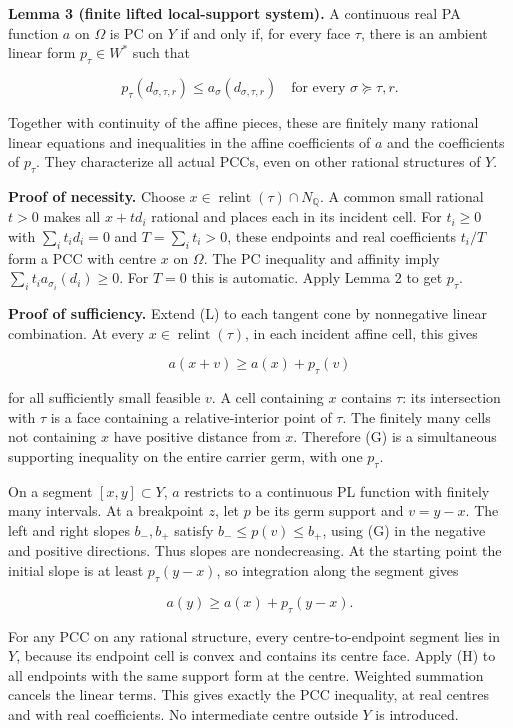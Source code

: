 \documentclass[
  10pt,
]{article}
\begin{document}
\textbf{Lemma 3 (finite lifted local-support system).} A continuous real
PA function \(a\) on \(\Omega\) is PC on \(Y\) if and only if, for every
face \(\tau\), there is an ambient linear form \(p_\tau\in W^*\) such
that

\[
p_\tau(d_{\sigma,\tau,r})
\leq a_\sigma(d_{\sigma,\tau,r})
\quad\text{for every }\sigma\succeq\tau,r. \tag{L}
\]

Together with continuity of the affine pieces, these are finitely many
rational linear equations and inequalities in the affine coefficients of
\(a\) and the coefficients of \(p_\tau\). They characterize all actual
PCCs, even on other rational structures of \(Y\).

\textbf{Proof of necessity.} Choose
\(x\in\operatorname{relint}(\tau)\cap N_{\mathbb Q}\). A common small
rational \(t>0\) makes all \(x+td_i\) rational and places each in its
incident cell. For \(t_i\geq0\) with \(\sum_i t_i d_i=0\) and
\(T=\sum_i t_i>0\), these endpoints and real coefficients \(t_i/T\) form
a PCC with centre \(x\) on \(\Omega\). The PC inequality and affinity
imply \(\sum_i t_i a_{\sigma_i}(d_i)\geq0\). For \(T=0\) this is
automatic. Apply Lemma 2 to get \(p_\tau\).

\textbf{Proof of sufficiency.} Extend (L) to each tangent cone by
nonnegative linear combination. At every
\(x\in\operatorname{relint}(\tau)\), in each incident affine cell, this
gives

\[
a(x+v)\geq a(x)+p_\tau(v) \tag{G}
\]

for all sufficiently small feasible \(v\). A cell containing \(x\)
contains \(\tau\): its intersection with \(\tau\) is a face containing a
relative-interior point of \(\tau\). The finitely many cells not
containing \(x\) have positive distance from \(x\). Therefore (G) is a
simultaneous supporting inequality on the entire carrier germ, with one
\(p_\tau\).

On a segment \([x,y]\subset Y\), \(a\) restricts to a continuous PL
function with finitely many intervals. At a breakpoint \(z\), let \(p\)
be its germ support and \(v=y-x\). The left and right slopes \(b_-,b_+\)
satisfy \(b_-\leq p(v)\leq b_+\), using (G) in the negative and positive
directions. Thus slopes are nondecreasing. At the starting point the
initial slope is at least \(p_\tau(y-x)\), so integration along the
segment gives

\[
a(y)\geq a(x)+p_\tau(y-x). \tag{H}
\]

For any PCC on any rational structure, every centre-to-endpoint segment
lies in \(Y\), because its endpoint cell is convex and contains its
centre face. Apply (H) to all endpoints with the same support form at
the centre. Weighted summation cancels the linear terms. This gives
exactly the PCC inequality, at real centres and with real coefficients.
No intermediate centre outside \(Y\) is introduced.
\end{document}
